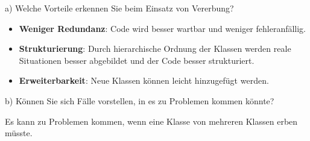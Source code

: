 \documentclass[11pt, a4paper, oneside]{article}
\begin{document}
	
	a) Welche Vorteile erkennen Sie beim Einsatz von Vererbung?
	
	\begin{itemize}
		\item \textbf{Weniger Redundanz}: Code wird besser wartbar und weniger fehleranfällig.
		\item \textbf{Strukturierung}: Durch hierarchische Ordnung der Klassen werden reale Situationen besser abgebildet und der Code besser strukturiert.
		\item \textbf{Erweiterbarkeit}: Neue Klassen können leicht hinzugefügt werden.
	\end{itemize}
	
	b) Können Sie sich Fälle vorstellen, in es zu Problemen kommen könnte?
	
	Es kann zu Problemen kommen, wenn eine Klasse von mehreren Klassen erben müsste.
	
\end{document}
